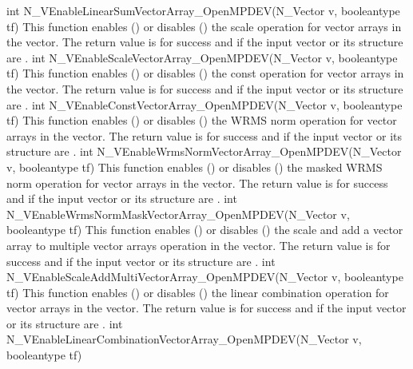{
  int N\_VEnableLinearSumVectorArray\_OpenMPDEV(N\_Vector v, booleantype tf)
}
{
  This function enables () or disables () the scale
  operation for vector arrays in the {\nvecopenmpdev} vector. The return value is  for
  success and  if the input vector or its  structure are .
}
{
  int N\_VEnableScaleVectorArray\_OpenMPDEV(N\_Vector v, booleantype tf)
}
{
  This function enables () or disables () the const
  operation for vector arrays in the {\nvecopenmpdev} vector. The return value is  for
  success and  if the input vector or its  structure are .
}
{
  int N\_VEnableConstVectorArray\_OpenMPDEV(N\_Vector v, booleantype tf)
}
{
  This function enables () or disables () the WRMS norm
  operation for vector arrays in the {\nvecopenmpdev} vector. The return value is  for
  success and  if the input vector or its  structure are .
}
{
  int N\_VEnableWrmsNormVectorArray\_OpenMPDEV(N\_Vector v, booleantype tf)
}
{
  This function enables () or disables () the masked WRMS
  norm operation for vector arrays in the {\nvecopenmpdev} vector. The return value is
   for success and  if the input vector or its  structure are
  .
}
{
  int N\_VEnableWrmsNormMaskVectorArray\_OpenMPDEV(N\_Vector v,
  booleantype tf)
}
{
  This function enables () or disables () the scale and
  add a vector array to multiple vector arrays operation in the {\nvecopenmpdev} vector. The
  return value is  for success and  if the input vector or its
   structure are .
}
{
  int N\_VEnableScaleAddMultiVectorArray\_OpenMPDEV(N\_Vector v,
  booleantype tf)
}
{
  This function enables () or disables () the linear
  combination operation for vector arrays in the {\nvecopenmpdev} vector. The return value
  is  for success and  if the input vector or its  structure
  are .
}
{
  int N\_VEnableLinearCombinationVectorArray\_OpenMPDEV(N\_Vector v,
  booleantype tf)
}
